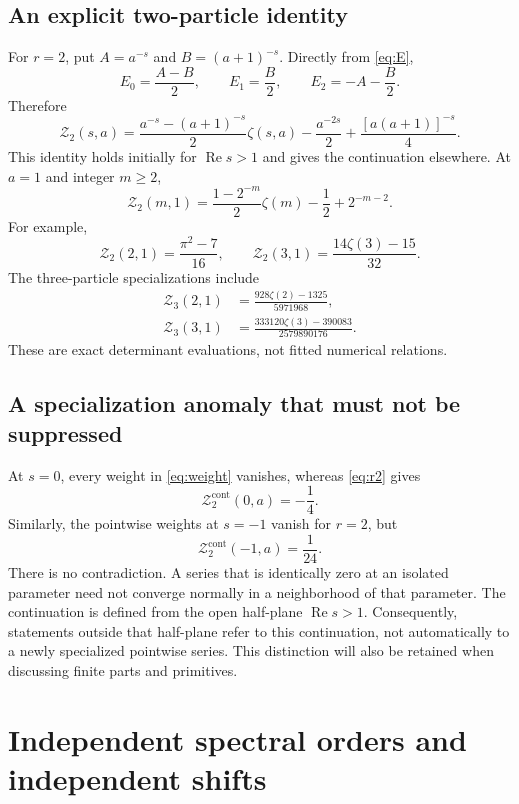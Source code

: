 \documentclass[11pt,letterpaper]{article}
\numberwithin{equation}{section}
\theoremstyle{definition}\newtheorem{definition}[theorem]{Definition}
\theoremstyle{remark}\newtheorem{remark}[theorem]{Remark}
\DeclareMathOperator{\Rea}{Re}
\newcommand{\Z}{\mathcal Z}\newcommand{\Bell}{\mathcal B}
\begin{document}
\subsection{An explicit two-particle identity}
For $r=2$, put $A=a^{-s}$ and $B=(a+1)^{-s}$. Directly from
\eqref{eq:E},
\[
 E_0=\frac{A-B}{2},\qquad E_1=\frac B2,\qquad
 E_2=-A-\frac B2.
\]
Therefore
\begin{equation}\label{eq:r2}
 \boxed{\displaystyle
 \Z_2(s,a)=\frac{a^{-s}-(a+1)^{-s}}2\zeta(s,a)
       -\frac{a^{-2s}}2+\frac{[a(a+1)]^{-s}}4.}
\end{equation}
This identity holds initially for $\Rea s>1$ and gives the continuation
elsewhere. At $a=1$ and integer $m\ge2$,
\begin{equation}\label{eq:r2-integer}
 \Z_2(m,1)=\frac{1-2^{-m}}2\zeta(m)-\frac12+2^{-m-2}.
\end{equation}
For example,
\[
 \Z_2(2,1)=\frac{\pi^2-7}{16},\qquad
 \Z_2(3,1)=\frac{14\zeta(3)-15}{32}.
\]
The three-particle specializations include
\begin{align}
 \Z_3(2,1)&=\frac{928\zeta(2)-1325}{5971968},\label{eq:r3m2}\\
 \Z_3(3,1)&=\frac{333120\zeta(3)-390083}{2579890176}.
 \label{eq:r3m3}
\end{align}
These are exact determinant evaluations, not fitted numerical relations.

\subsection{A specialization anomaly that must not be suppressed}
\label{sec:anomaly}
At $s=0$, every weight in \eqref{eq:weight} vanishes, whereas
\eqref{eq:r2} gives
\begin{equation}\label{eq:anomaly}
 \Z_2^{\mathrm{cont}}(0,a)=-\frac14.
\end{equation}
Similarly, the pointwise weights at $s=-1$ vanish for $r=2$, but
\[
 \Z_2^{\mathrm{cont}}(-1,a)=\frac1{24}.
\]
There is no contradiction. A series that is identically zero at an isolated
parameter need not converge normally in a neighborhood of that parameter.
The continuation is defined from the open half-plane $\Rea s>1$.
Consequently, statements outside that half-plane refer to this continuation,
not automatically to a newly specialized pointwise series. This distinction
will also be retained when discussing finite parts and primitives.

\section{Independent spectral orders and independent shifts}
\label{sec:polarization}
\end{document}
